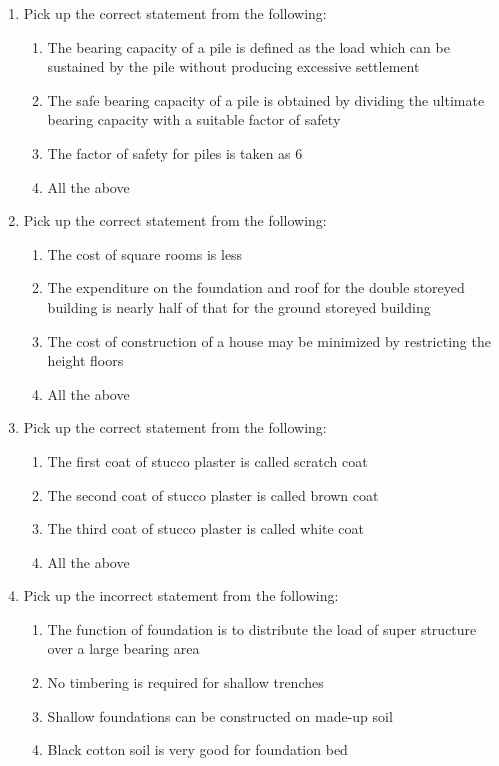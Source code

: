 \documentclass[11pt,a4paper]{article}
\begin{document}
\begin{enumerate}
\begin{enumerate}[label=\Alph*.]
\end{enumerate}
\item{Pick up the correct statement from the following:}
\begin{enumerate}[label=\Alph*.]
\item{The bearing capacity of a pile is defined as the load which can be sustained by the pile without producing excessive settlement}
\item{The safe bearing capacity of a pile is obtained by dividing the ultimate bearing capacity with a suitable factor of safety}
\item{The factor of safety for piles is taken as 6}
\item{All the above}
\end{enumerate}
\item{Pick up the correct statement from the following:}
\begin{enumerate}[label=\Alph*.]
\item{The cost of square rooms is less}
\item{The expenditure on the foundation and roof for the double storeyed building is nearly half of that for the ground storeyed building}
\item{The cost of construction of a house may be minimized by restricting the height floors}
\item{All the above}
\end{enumerate}
\item{Pick up the correct statement from the following:}
\begin{enumerate}[label=\Alph*.]
\item{The first coat of stucco plaster is called scratch coat}
\item{The second coat of stucco plaster is called brown coat}
\item{The third coat of stucco plaster is called white coat}
\item{All the above}
\end{enumerate}
\item{Pick up the incorrect statement from the following:}
\begin{enumerate}[label=\Alph*.]
\item{The function of foundation is to distribute the load of super structure over a large bearing area}
\item{No timbering is required for shallow trenches}
\item{Shallow foundations can be constructed on made-up soil}
\item{Black cotton soil is very good for foundation bed}

\end{enumerate}
\end{enumerate}
\end{document}
